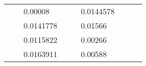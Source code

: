 \begin{table}[H]
\begin{tabular}{|cclcclccc}
\multicolumn{1}{|c|}{\cellcolor[HTML]{FFFFC7}}                                & \multicolumn{1}{c|}{\cellcolor[HTML]{DDFDFF}}                      & \multicolumn{1}{l|}{\cellcolor[HTML]{DAE8FC}0.00008}     & \multicolumn{1}{c|}{\cellcolor[HTML]{FFFFC7}}                                & \multicolumn{1}{c|}{\cellcolor[HTML]{DDFDFF}}                       & \multicolumn{1}{l|}{\cellcolor[HTML]{DDFDFF}0.0144578}   &                                                                              &                                                                    &                                                          \\ \cline{3-3} \cline{6-6}
\multicolumn{1}{|c|}{\cellcolor[HTML]{FFFFC7}}                                & \multicolumn{1}{c|}{\cellcolor[HTML]{DDFDFF}}                      & \multicolumn{1}{l|}{\cellcolor[HTML]{DDFDFF}0.0141778}   & \multicolumn{1}{c|}{\cellcolor[HTML]{FFFFC7}}                                & \multicolumn{1}{c|}{\cellcolor[HTML]{DDFDFF}}                       & \multicolumn{1}{l|}{\cellcolor[HTML]{DAE8FC}0.01566}     &                                                                              &                                                                    &                                                          \\ \cline{3-3} \cline{6-6}
\multicolumn{1}{|c|}{\cellcolor[HTML]{FFFFC7}}                                & \multicolumn{1}{c|}{\cellcolor[HTML]{DDFDFF}}                      & \multicolumn{1}{l|}{\cellcolor[HTML]{DAE8FC}0.0115822}   & \multicolumn{1}{c|}{\cellcolor[HTML]{FFFFC7}}                                & \multicolumn{1}{c|}{\cellcolor[HTML]{DDFDFF}}                       & \multicolumn{1}{l|}{\cellcolor[HTML]{DDFDFF}0.00266}     &                                                                              &                                                                    &                                                          \\ \cline{3-3} \cline{6-6}
\multicolumn{1}{|c|}{\cellcolor[HTML]{FFFFC7}}                                & \multicolumn{1}{c|}{\cellcolor[HTML]{DDFDFF}}                      & \multicolumn{1}{l|}{\cellcolor[HTML]{DDFDFF}0.0163911}   & \multicolumn{1}{c|}{\cellcolor[HTML]{FFFFC7}}                                & \multicolumn{1}{c|}{\cellcolor[HTML]{DDFDFF}}                       & \multicolumn{1}{l|}{\cellcolor[HTML]{DAE8FC}0.00588}     &                                                                              &                                                                    &                                                          \\ \cline{3-3} \cline{6-6}

\end{tabular}
\end{table}
